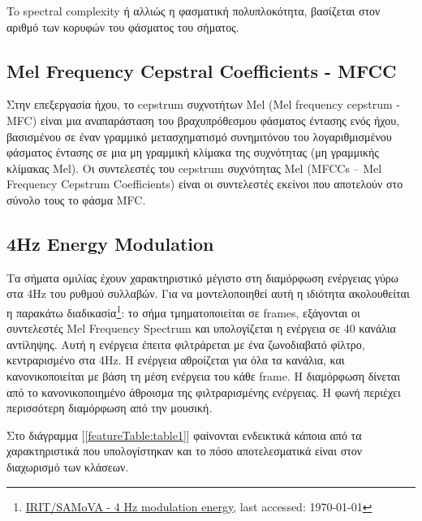 To spectral complexity ή αλλιώς η φασματική πολυπλοκότητα, βασίζεται στον αριθμό των κορυφών του φάσματος του σήματος.

\subsection{Mel Frequency Cepstral Coefficients - MFCC}

Στην επεξεργασία ήχου, το cepstrum συχνοτήτων Mel (Μel frequency cepstrum - MFC) είναι μια αναπαράσταση του βραχυπρόθεσμου φάσματος έντασης ενός ήχου, βασισμένου σε έναν γραμμικό μετασχηματισμό συνημιτόνου του λογαριθμισμένου φάσματος έντασης σε μια μη γραμμική κλίμακα της συχνότητας (μη γραμμικής κλίμακας Mel).  Οι συντελεστές του cepstrum συχνότητας Mel (MFCCs – Mel Frequency Cepstrum Coefficients) είναι οι συντελεστές εκείνοι που αποτελούν στο σύνολο τους το φάσμα MFC.

\subsection{4Hz Energy Modulation}

Τα σήματα ομιλίας έχουν χαρακτηριστικό μέγιστο στη διαμόρφωση ενέργειας γύρω στα 4Hz του ρυθμού συλλαβών. Για να μοντελοποιηθεί αυτή η ιδιότητα ακολουθείται η παρακάτω διαδικασία\footnote{\href{https://www.irit.fr/recherches/SAMOVA/FeaturesExtraction.html\#me4hz}{IRIT/SAMoVA - 4 Hz modulation energy}, last accessed: \today}: το σήμα τμηματοποιείται σε frames, εξάγονται οι συντελεστές Mel Frequency Spectrum και υπολογίζεται η ενέργεια σε 40 κανάλια αντίληψης. Αυτή η ενέργεια έπειτα φιλτράρεται με ένα ζωνοδιαβατό φίλτρο, κεντραρισμένο στα 4Hz. Η ενέργεια αθροίζεται για όλα τα κανάλια, και κανονικοποιείται με βάση τη μέση ενέργεια του κάθε frame. Η διαμόρφωση δίνεται από το κανονικοποιημένο άθροισμα της φιλτραρισμένης ενέργειας. Η φωνή περιέχει περισσότερη διαμόρφωση από την μουσική.

\vspace{1em}
Στο διάγραμμα [\ref{featureTable:table1}] φαίνονται ενδεικτικά κάποια από τα χαρακτηριστικά που υπολογίστηκαν και το πόσο αποτελεσματικά είναι στον διαχωρισμό των κλάσεων.

